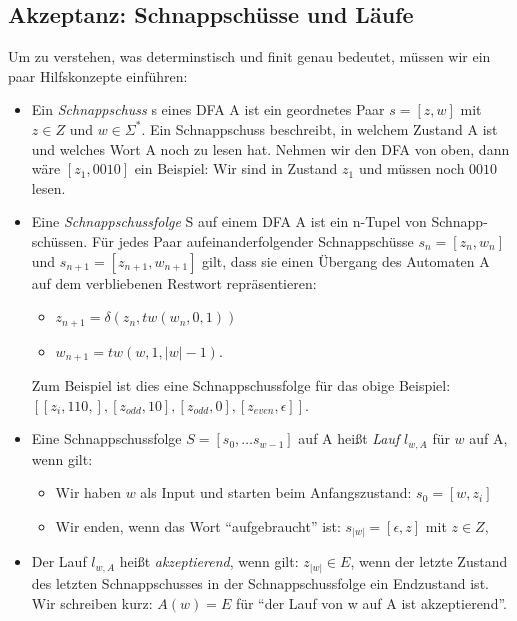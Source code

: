 \subsection{Akzeptanz: Schnappschüsse und Läufe}
Um zu verstehen, was determinstisch und finit genau bedeutet,
müssen wir ein paar Hilfskonzepte einführen:
\begin{itemize}
    \item Ein \emph{Schnappschuss} s eines DFA A ist ein geordnetes Paar $s = [z, w]$
        mit $z \in Z$ und $w \in \Sigma^*$.
        Ein Schnappschuss beschreibt,
        in welchem Zustand A ist und welches Wort A noch zu lesen hat.
        Nehmen wir den DFA von oben, dann wäre $[z_1,0010]$ ein Beispiel:
        Wir sind in Zustand $z_1$ und müssen noch $0010$ lesen.
    \item Eine \emph{Schnappschussfolge} S auf einem DFA A
        ist ein n-Tupel von Schnapp-schüssen. 
        Für jedes Paar aufeinanderfolgender Schnappschüsse $s_n = [z_n, w_n]$
        und $s_{n+1} = [z_{n+1}, w_{n+1}]$ gilt,
        dass sie einen Übergang des Automaten A auf dem verbliebenen Restwort repräsentieren:
        \begin{itemize}
            \item $z_{n+1} = \delta(z_n, tw(w_{n},0,1))$
            \item $w_{n+1} = tw(w,1,|w|-1)$.
        \end{itemize}
        Zum Beispiel ist dies eine Schnappschussfolge für das obige Beispiel:\linebreak
        $[[z_i,110,],[z_{odd},10],[z_{odd},0],[z_{even},\epsilon]]$.
    \item Eine Schnappschussfolge $S = [s_0, \ldots s_{w-1}]$ auf A
        heißt \emph{Lauf} $l_{w,A}$ für $w$ auf A, wenn gilt:
        \begin{itemize}
            \item Wir haben $w$ als Input und starten beim Anfangszustand:
                $s_0 = [w, z_i]$ 
            \item Wir enden, wenn das Wort ``aufgebraucht'' ist:
                $s_{|w|} = [\epsilon, z]$ mit $z \in Z$,

        \end{itemize}
    \item Der Lauf $l_{w,A}$ heißt \emph{akzeptierend}, wenn gilt:
        $z_{|w|} \in E$,
        wenn der letzte Zustand des letzten Schnappschusses in der Schnappschussfolge
        ein Endzustand ist.
        Wir schreiben kurz: $A(w) = E$
        für ``der Lauf von w auf A ist akzeptierend''. 

\end{itemize}

